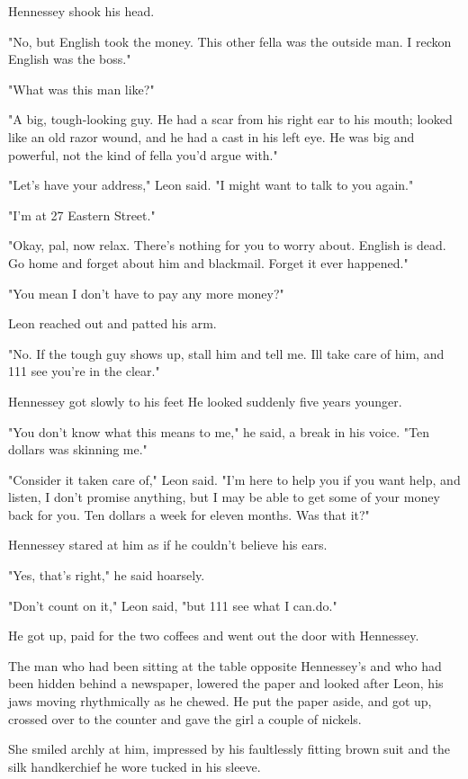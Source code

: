 \documentclass{novel}
\begin{document}
Hennessey shook his head.

"No, but English took the money. This other fella was the outside man. I reckon English was the boss."

"What was this man like?"

"A big, tough-looking guy. He had a scar from his right ear to his mouth; looked like an old razor wound, and he had a cast in his left eye. He was big and powerful, not the kind of fella you'd argue with."

"Let's have your address," Leon said. "I might want to talk to you again."

"I'm at 27 Eastern Street."

"Okay, pal, now relax. There's nothing for you to worry about. English is dead. Go home and forget about him and blackmail. Forget it ever happened."

"You mean I don't have to pay any more money?"

Leon reached out and patted his arm.

"No. If the tough guy shows up, stall him and tell me. Ill take care of him, and 111 see you're in the clear."

Hennessey got slowly to his feet He looked suddenly five years younger.

"You don't know what this means to me," he said, a break in his voice. "Ten dollars was skinning me."

"Consider it taken care of," Leon said. "I'm here to help you if you want help, and listen, I don't promise anything, but I may be able to get some of your money back for you. Ten dollars a week for eleven months. Was that it?"

Hennessey stared at him as if he couldn't believe his ears.

"Yes, that's right," he said hoarsely.

"Don't count on it," Leon said, "but 111 see what I can.do."

He got up, paid for the two coffees and went out the door with Hennessey.

The man who had been sitting at the table opposite Hennessey's and who had been hidden behind a newspaper, lowered the paper and looked after Leon, his jaws moving rhythmically as he chewed. He put the paper aside, and got up, crossed over to the counter and gave the girl a couple of nickels.

She smiled archly at him, impressed by his faultlessly fitting brown suit and the silk handkerchief he wore tucked in his sleeve.
\end{document}
